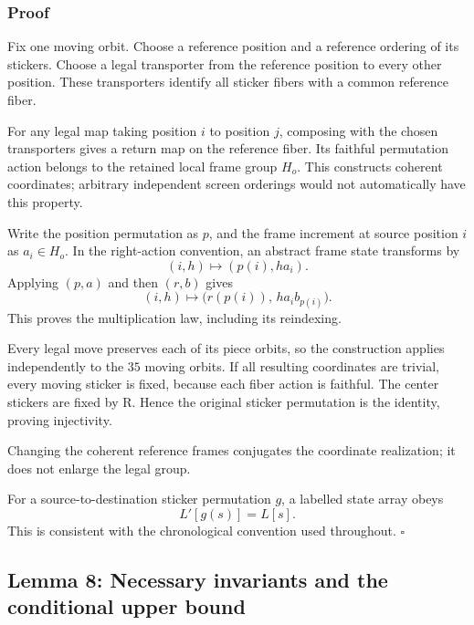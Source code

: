 \documentclass[
  10pt,
  a4paper,
]{article}
\begin{document}
\subsubsection{Proof}\label{proof-6}

Fix one moving orbit. Choose a reference position and a reference
ordering of its stickers. Choose a legal transporter from the reference
position to every other position. These transporters identify all
sticker fibers with a common reference fiber.

For any legal map taking position \(i\) to position \(j\), composing
with the chosen transporters gives a return map on the reference fiber.
Its faithful permutation action belongs to the retained local frame
group \(H_o\). This constructs coherent coordinates; arbitrary
independent screen orderings would not automatically have this property.

Write the position permutation as \(p\), and the frame increment at
source position \(i\) as \(a_i\in H_o\). In the right-action convention,
an abstract frame state transforms by \begin{equation}
(i,h)\longmapsto(p(i),ha_i).
\end{equation} Applying \((p,a)\) and then \((r,b)\) gives
\begin{equation}
(i,h)\longmapsto
\bigl(r(p(i)),\,h a_i b_{p(i)}\bigr).
\end{equation} This proves the multiplication law, including its
reindexing.

Every legal move preserves each of its piece orbits, so the construction
applies independently to the \(35\) moving orbits. If all resulting
coordinates are trivial, every moving sticker is fixed, because each
fiber action is faithful. The center stickers are fixed by R. Hence the
original sticker permutation is the identity, proving injectivity.

Changing the coherent reference frames conjugates the coordinate
realization; it does not enlarge the legal group.

For a source-to-destination sticker permutation \(g\), a labelled state
array obeys \begin{equation}
L'[g(s)]=L[s].
\end{equation} This is consistent with the chronological convention used
throughout. \(\square\)

\subsection{Lemma 8: Necessary invariants and the conditional upper
bound}\label{lemma-8-necessary-invariants-and-the-conditional-upper-bound}
\end{document}
